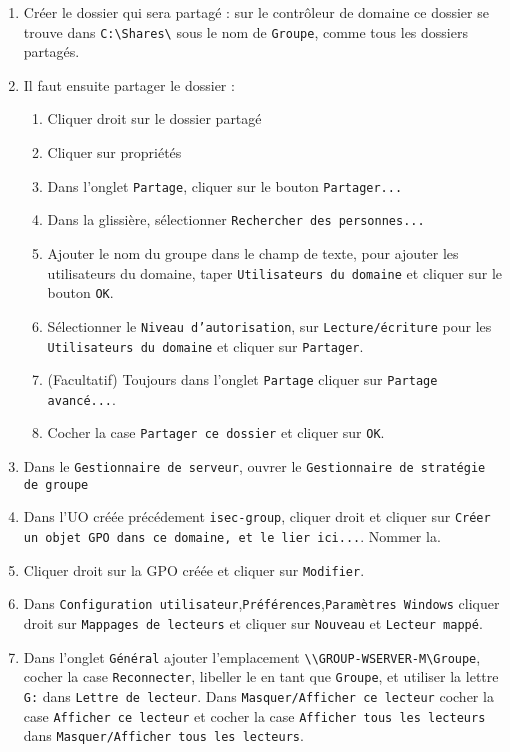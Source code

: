 				\begin{enumerate}
					\item Créer le dossier qui sera partagé : sur le contrôleur de domaine ce dossier se trouve dans \texttt{C:\textbackslash{}Shares\textbackslash}  sous le nom de \texttt{Groupe}, comme tous les dossiers partagés.
					\item Il faut ensuite partager le dossier : 
						\begin{enumerate}
							\item Cliquer droit sur le dossier partagé
							\item Cliquer sur propriétés
							\item Dans l'onglet \texttt{Partage}, cliquer sur le bouton \texttt{Partager...}
							\item Dans la glissière, sélectionner \texttt{Rechercher des personnes...}
							\item Ajouter le nom du groupe dans le champ de texte, pour ajouter les utilisateurs du domaine, taper \texttt{Utilisateurs du domaine} et cliquer sur le bouton \texttt{OK}.
							\item Sélectionner le \texttt{Niveau d'autorisation}, sur \texttt{Lecture/écriture} pour les \texttt{Utilisateurs du domaine} et cliquer sur \texttt{Partager}.
							\item (Facultatif) Toujours dans l'onglet \texttt{Partage} cliquer sur \texttt{Partage avancé...}.
							\item Cocher la case \texttt{Partager ce dossier} et cliquer sur \texttt{OK}.
						\end{enumerate}  
						\item Dans le \texttt{Gestionnaire de serveur}, ouvrer le \texttt{Gestionnaire de stratégie de groupe}
						\item Dans l'UO créée précédement \texttt{isec-group}, cliquer droit et cliquer sur \texttt{Créer un objet GPO dans ce domaine, et le lier ici...}. Nommer la. 
						\item Cliquer droit sur la GPO créée et cliquer sur \texttt{Modifier}.
						\item Dans \texttt{Configuration utilisateur},\texttt{Préférences},\texttt{Paramètres Windows} cliquer droit sur \texttt{Mappages de lecteurs} et cliquer sur \texttt{Nouveau} et \texttt{Lecteur mappé}.
						\item Dans l'onglet \texttt{Général} ajouter l'emplacement \texttt{\textbackslash{}\textbackslash{}GROUP-WSERVER-M\textbackslash{}Groupe}, cocher la case \texttt{Reconnecter}, libeller le en tant que \texttt{Groupe}, et utiliser la lettre \texttt{G:} dans \texttt{Lettre de lecteur}. Dans \texttt{Masquer/Afficher ce lecteur} cocher la case \texttt{Afficher ce lecteur} et cocher la case \texttt{Afficher tous les lecteurs} dans \texttt{Masquer/Afficher tous les lecteurs}.

\end{enumerate}
